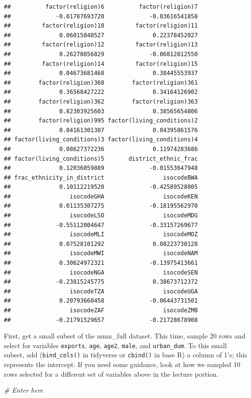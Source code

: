 \documentclass[]{book}
\newenvironment{Shaded}{\begin{snugshade}}{\end{snugshade}}
\newcommand{\CommentTok}[1]{\textcolor[rgb]{0.56,0.35,0.01}{\textit{#1}}}
\theoremstyle{definition}
\theoremstyle{definition}
\theoremstyle{definition}
\theoremstyle{remark}
\begin{document}
\begin{verbatim}
##          factor(religion)6          factor(religion)7 
##             -0.01787693720             -0.03616541858 
##         factor(religion)10         factor(religion)11 
##              0.06015040527              0.22378452027 
##         factor(religion)12         factor(religion)13 
##              0.26270856829             -0.06812812550 
##         factor(religion)14         factor(religion)15 
##              0.04673681468              0.38445553937 
##        factor(religion)360        factor(religion)361 
##              0.36568427222              0.34164126902 
##        factor(religion)362        factor(religion)363 
##              0.82303925603              0.38565654806 
##        factor(religion)995 factor(living_conditions)2 
##              0.04161301307              0.04395861576 
## factor(living_conditions)3 factor(living_conditions)4 
##              0.08627372236              0.11974283686 
## factor(living_conditions)5       district_ethnic_frac 
##              0.12036059889             -0.01553647948 
## frac_ethnicity_in_district                 isocodeBWA 
##              0.10112219520             -0.42589528005 
##                 isocodeGHA                 isocodeKEN 
##              0.01135307275             -0.18195562970 
##                 isocodeLSO                 isocodeMDG 
##             -0.55112004647             -0.33157269677 
##                 isocodeMLI                 isocodeMOZ 
##              0.07528101292              0.08223730128 
##                 isocodeMWI                 isocodeNAM 
##              0.30624972321             -0.13975413661 
##                 isocodeNGA                 isocodeSEN 
##             -0.23815245775              0.38673712372 
##                 isocodeTZA                 isocodeUGA 
##              0.20793660458             -0.06443731501 
##                 isocodeZAF                 isocodeZMB 
##             -0.21791529657             -0.21728678908
\end{verbatim}

First, get a small subset of the nunn\_full dataset. This time, sample 20 rows and select for variables \texttt{exports}, \texttt{age}, \texttt{age2}, \texttt{male}, and \texttt{urban\_dum}. To this small subset, add (\texttt{bind\_cols()} in tidyverse or \texttt{cbind()} in base R) a column of 1's; this represents the intercept. If you need some guidance, look at how we sampled 10 rows selected for a different set of variables above in the lecture portion.

\begin{Shaded}
\begin{Highlighting}[]
\CommentTok{# Enter here}
\end{Highlighting}
\end{Shaded}
\end{document}
